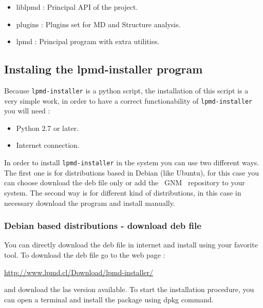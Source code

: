 \begin{itemize}
 \item liblpmd : Principal API of the project.
 \item plugins : Plugins set for MD and Structure analysis.
 \item lpmd : Principal program with extra utilities.
\end{itemize}


\subsection{Instaling the lpmd-installer program}

Because \verb|lpmd-installer| is a python script, the installation of this
script is a very simple work, in order to have a correct functionability of
\verb|lpmd-installer| you will need :

\begin{itemize}
\item Python 2.7 or later.
\item Internet connection.
\end{itemize}

In order to install \verb|lpmd-installer| in the system you can use two
different ways. The first one is for distributions based in Debian (like
Ubuntu), for this case you can choose download the deb file only or add the
~GNM ~repository to your system. The
second way is for different kind of distributions, in this case in necessary
download the program and install manually.

\subsubsection{Debian based distributions - download deb file}
You can directly download the deb file in internet and install using your
favorite tool. To download the deb file go to the web page :

\url{http://www.lpmd.cl/Download/lpmd-installer/}

\noindent
and download the las version available. To start the installation procedure, you
can open a terminal and install the package using dpkg command.

